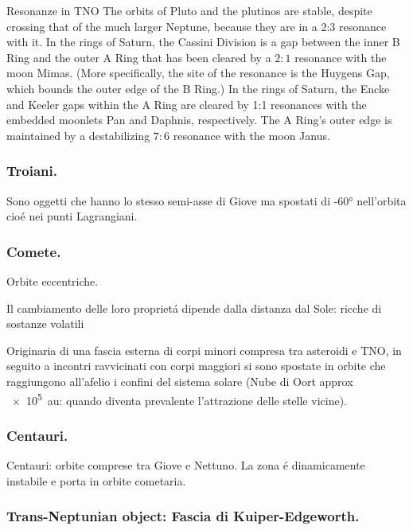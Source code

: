 \begin{frame}{Resonanze in TNO}
The orbits of Pluto and the plutinos are stable, despite crossing that of the much larger Neptune, because they are in a 2:3 resonance with it.
In the rings of Saturn, the Cassini Division is a gap between the inner B Ring and the outer A Ring that has been cleared by a $2:1$ resonance with the moon Mimas. (More specifically, the site of the resonance is the Huygens Gap, which bounds the outer edge of the B Ring.)
    In the rings of Saturn, the Encke and Keeler gaps within the A Ring are cleared by 1:1 resonances with the embedded moonlets Pan and Daphnis, respectively. The A Ring's outer edge is maintained by a destabilizing $7:6$ resonance with the moon Janus.
\end{frame}

\subsubsection{Troiani.}

Sono oggetti che hanno lo stesso semi-asse di Giove ma spostati di \ang{+-60} nell'orbita cio\'e nei punti Lagrangiani.

\subsubsection{Comete.}
Orbite eccentriche.

Il cambiamento delle loro propriet\'a dipende dalla distanza dal Sole: ricche di sostanze volatili

Originaria di una fascia esterna di corpi minori compresa tra asteroidi e TNO, in seguito a incontri ravvicinati con corpi maggiori si sono spostate in orbite che raggiungono all'afelio i confini del sistema solare (Nube di Oort approx \SI{e5}{\astronomicalunit}: quando diventa prevalente l'attrazione delle stelle vicine).

\subsubsection{Centauri.}

Centauri: orbite comprese tra Giove e Nettuno. La zona \'e dinamicamente instabile e porta in orbite cometaria.

\subsubsection{Trans-Neptunian object: Fascia di Kuiper-Edgeworth.}

